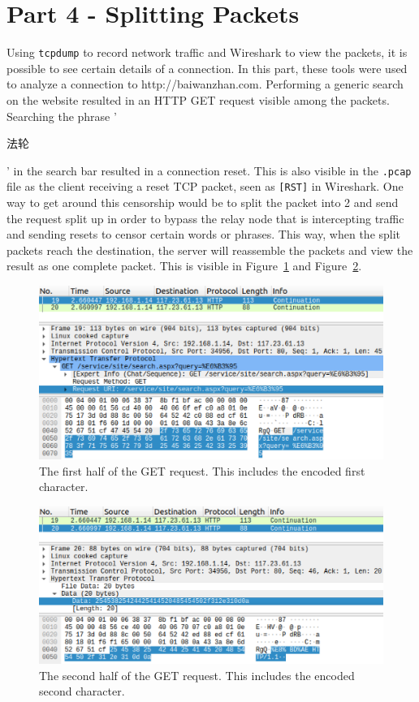 \documentclass[11pt]{article}
\begin{document}
\section*{Part 4 - Splitting Packets}
Using \verb|tcpdump| to record network traffic and Wireshark to view the packets, it is possible to
see certain details of a connection. In this part, these tools were used to analyze a connection to
http://baiwanzhan.com. Performing a generic search on the website resulted in an HTTP GET request
visible among the packets. Searching the phrase '\begin{CJK*}{UTF8}{gbsn}法轮\end{CJK*}' in the search
bar resulted in a connection reset. This is also visible in the \verb|.pcap| file as the client receiving
a reset TCP packet, seen as \verb|[RST]| in Wireshark. One way to get around this censorship would be to
split the packet into 2 and send the request split up in order to bypass the relay node that is intercepting
traffic and sending resets to censor certain words or phrases. This way, when the split packets reach the
destination, the server will reassemble the packets and view the result as one complete packet. This is
visible in Figure~\ref{fig:pkt_1} and Figure~\ref{fig:pkt_2}.
\begin{figure}[htbp]
  \centering
  \includegraphics[width=.85\linewidth]{./packet1.png}
  \caption{\label{fig:pkt_1}
  The first half of the GET request. This includes the encoded first character.}
\end{figure}
\begin{figure}[htbp]
  \centering
  \includegraphics[width=.85\linewidth]{./packet2.png}
  \caption{\label{fig:pkt_2}
  The second half of the GET request. This includes the encoded second character.}
\end{figure}
\end{document}
